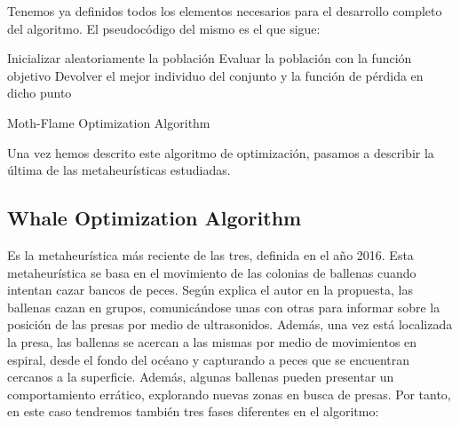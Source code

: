 \documentclass[
  a4paper,
,tablecaptionabove
]{scrartcl}
\begin{document}
Tenemos ya definidos todos los elementos necesarios para el desarrollo
completo del algoritmo. El pseudocódigo del mismo es el que sigue:

\begin{algorithm}[H]
\DontPrintSemicolon
\SetAlgoLined
\BlankLine
    Inicializar aleatoriamente la población\;
    Evaluar la población con la función objetivo\;
    Devolver el mejor individuo del conjunto y la función de pérdida en dicho punto\;
\caption{Moth-Flame Optimization Algorithm}
\end{algorithm}

Una vez hemos descrito este algoritmo de optimización, pasamos a
describir la última de las metaheurísticas estudiadas.

\hypertarget{whale-optimization-algorithm}{%
\subsection{Whale Optimization
Algorithm}\label{whale-optimization-algorithm}}

Es la metaheurística más reciente de las tres, definida en el año 2016.
Esta metaheurística se basa en el movimiento de las colonias de ballenas
cuando intentan cazar bancos de peces. Según explica el autor en la
propuesta, las ballenas cazan en grupos, comunicándose unas con otras
para informar sobre la posición de las presas por medio de ultrasonidos.
Además, una vez está localizada la presa, las ballenas se acercan a las
mismas por medio de movimientos en espiral, desde el fondo del océano y
capturando a peces que se encuentran cercanos a la superficie. Además,
algunas ballenas pueden presentar un comportamiento errático, explorando
nuevas zonas en busca de presas. Por tanto, en este caso tendremos
también tres fases diferentes en el algoritmo:
\end{document}
